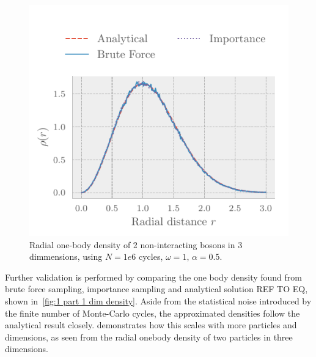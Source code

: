 \begin{figure}[ht]
  \includegraphics[]{figures/density2.pdf}
  \caption{Radial one-body density of 2 non-interacting bosons in 3 dimmensions, using $N = 1e6$ cycles, $\omega = 1$, $\alpha = 0.5$.}
  \label{fig:2 part 3 dim density}
\end{figure}


Further validation is performed by comparing the one body density found from
brute force sampling, importance sampling and analytical solution REF TO EQ,
shown in~\vref{fig:1 part 1 dim density}. Aside from the statistical noise
introduced by the finite number of Monte-Carlo cycles, the approximated
densities follow the analytical result closely.  demonstrates how this scales with more particles and dimensions,
as seen from the radial onebody density of two particles in three dimensions.

